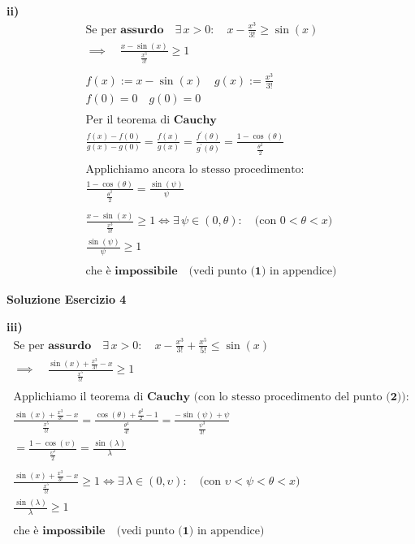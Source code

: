 \documentclass[11pt,reqno]{amsart}
\begin{document}
{\bf ii)}
\begin{gather*}
  \text{Se per } \textbf{assurdo} \quad \exists \, x>0: \quad x-\frac{x^3}{3!} \geq \sin(x)\\
  \implies \quad \frac{x-\sin(x)}{\frac{x^3}{3!}} \geq 1\\\\
  f(x) := x-\sin(x) \quad g(x) := \frac{x^3}{3!}\\
  f(0) = 0 \quad g(0) = 0\\\\
  \text{Per il teorema di } \textbf{Cauchy}\\
  \frac{f(x)-f(0)}{g(x)-g(0)} = \frac{f(x)}{g(x)} = \frac{f^{'}(\theta)}{g^{'}(\theta)} = \frac{1-\cos(\theta)}{\frac{\theta^2}{2}}\\\\
  \text{Applichiamo ancora lo stesso procedimento:}\\
  \frac{1-\cos(\theta)}{\frac{\theta^2}{2}} = \frac{\sin(\psi)}{\psi}\\\\
  \frac{x-\sin(x)}{\frac{x^3}{3!}} \geq 1 \iff \exists \, \psi \in (0,\theta): \quad \text{(con } 0< \theta <x \text{)}\\
  \frac{\sin(\psi)}{\psi} \geq 1\\\\
  \text{che è } \textbf{impossibile} \quad \text{(vedi punto } \textbf{(1)} \text{ in appendice)}
\end{gather*}

\newpage
\centerline{\bf Soluzione Esercizio 4 }
\bigskip

{\bf iii)}
\begin{gather*}
  \text{Se per } \textbf{assurdo} \quad \exists \, x>0: \quad x-\frac{x^3}{3!}+\frac{x^5}{5!} \leq \sin(x)\\
  \implies \quad \frac{\sin(x)+\frac{x^3}{3!}-x}{\frac{x^5}{5!}} \geq 1\\\\
  \text{Applichiamo il teorema di } \textbf{Cauchy} \text{ (con lo stesso procedimento del punto } \textbf{(2)} \text{)} \text{:}\\
  \frac{\sin(x)+\frac{x^3}{3!}-x}{\frac{x^5}{5!}} = \frac{\cos(\theta)+\frac{\theta^2}{2}-1}{\frac{\theta^4}{4!}} = \frac{-\sin(\psi)+\psi}{\frac{\psi^3}{3!}}\\
  = \frac{1-\cos(\upsilon)}{\frac{\upsilon^2}{2}} = \frac{\sin(\lambda)}{\lambda}\\\\
  \frac{\sin(x)+\frac{x^3}{3!}-x}{\frac{x^5}{5!}} \geq 1 \iff \exists \, \lambda \in (0,\upsilon): \quad \text{(con } \upsilon < \psi < \theta < x \text{)}\\
  \frac{\sin(\lambda)}{\lambda} \geq 1\\\\
  \text{che è } \textbf{impossibile} \quad \text{(vedi punto } \textbf{(1)} \text{ in appendice)}
\end{gather*}
\end{document}
